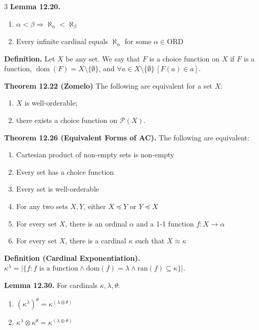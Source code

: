 \documentclass[landscape,8pt]{article}
\renewcommand{\implies}{\Rightarrow}
\begin{document}
\begin{multicols}{3}
	\noindent\textbf{Lemma 12.20.}
	\begin{enumerate}[noitemsep,topsep=0pt]
		\item $\alpha < \beta \implies \aleph_\alpha < \aleph_\beta$
		\item Every infinite cardinal equals $\aleph_\alpha$ for some $\alpha \in \text{ORD}$
	\end{enumerate}

	\noindent\textbf{Definition.} Let $X$ be any set. We say that $F$ is a choice function on $X$ if $F$ is a function, $\operatorname{dom}(F) = X \setminus \{\emptyset\}$, and $\forall a \in X \setminus \{\emptyset\} \, [F(a) \in a]$.

	\noindent\textbf{Theorem 12.22 (Zomelo)} The following are equivalent for a set $X$:
	\begin{enumerate}
		\item $X$ is well-orderable;
		\item there exists a choice function on $\mathcal{P}(X)$.
	\end{enumerate}

	\noindent\textbf{Theorem 12.26 (Equivalent Forms of AC).} The following are equivalent:
	\begin{enumerate}[noitemsep,topsep=0pt]
		\item Cartesian product of non-empty sets is non-empty
		\item Every set has a choice function
		\item Every set is well-orderable
		\item For any two sets $X, Y$, either $X \preceq Y$ or $Y \preceq X$
		\item For every set $X$, there is an ordinal $\alpha$ and a 1-1 function $f: X \to \alpha$
		\item For every set $X$, there is a cardinal $\kappa$ such that $X \approx \kappa$
	\end{enumerate}

	\noindent\textbf{Definition (Cardinal Exponentiation).} $\kappa^\lambda = |\{f : f \text{ is a function} \wedge \text{dom}(f) = \lambda \wedge \text{ran}(f) \subseteq \kappa\}|$.

	\noindent\textbf{Lemma 12.30.} For cardinals $\kappa, \lambda, \theta$:
	\begin{enumerate}[noitemsep,topsep=0pt]
		\item $\left(\kappa^\lambda\right)^\theta = \kappa^{(\lambda \otimes \theta)}$
		\item $\kappa^\lambda \otimes \kappa^\theta = \kappa^{(\lambda \oplus \theta)}$
	\end{enumerate}


\end{multicols}
\end{document}

